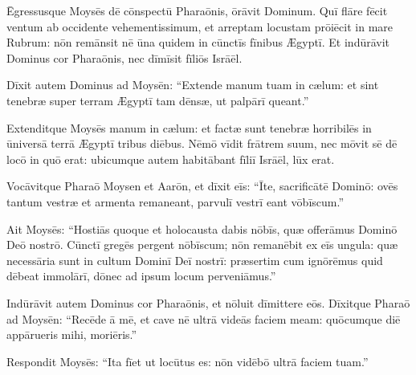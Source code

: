 Ēgressusque Moysēs dē cōnspectū Pharaōnis,
ōrāvit Dominum. Quī flāre fēcit ventum ab occidente
vehementissimum, et arreptam locustam
prōiēcit in mare Rubrum: nōn remānsit nē ūna quidem in cūnctīs fīnibus
Ægyptī. Et indūrāvit Dominus cor Pharaōnis, nec dīmīsit fīliōs
Isrāēl.  

Dīxit autem Dominus ad Moysēn: ``Extende manum
tuam in cælum: et sint tenebræ super terram Ægyptī tam
dēnsæ, ut palpārī queant.''

Extenditque
Moysēs manum in cælum: et factæ sunt tenebræ horribilēs in
ūniversā terrā Ægyptī tribus diēbus. Nēmō vīdit frātrem suum, nec mōvit
sē dē locō in quō erat: ubicumque autem habitābant fīliī
Isrāēl, lūx erat.

Vocāvitque Pharaō Moysen et Aarōn, et dīxit eīs: ``Īte,
sacrificātē Dominō: ovēs tantum vestræ et armenta
remaneant, parvulī vestrī eant vōbīscum.''

Ait Moysēs: ``Hostiās quoque et
holocausta dabis nōbīs, quæ offerāmus Dominō Deō nostrō. 
Cūnctī gregēs pergent nōbīscum; nōn remanēbit ex eīs
ungula: quæ necessāria sunt in cultum Dominī Deī nostrī:
præsertim cum ignōrēmus quid dēbeat
immolārī, dōnec ad ipsum locum
perveniāmus.''

Indūrāvit autem Dominus cor Pharaōnis, et nōluit dīmittere
eōs. Dīxitque Pharaō ad Moysēn: ``Recēde ā mē, et cave nē ultrā videās
faciem meam: quōcumque diē appārueris mihi, moriēris.''

Respondit Moysēs: ``Ita fīet ut locūtus es: nōn vidēbō ultrā faciem tuam.''
